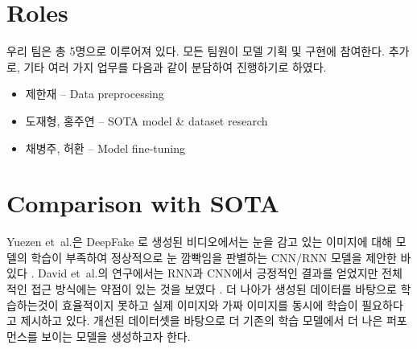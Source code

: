 \documentclass{article}
\begin{document}
\section{Roles}

우리 팀은 총 5명으로 이루어져 있다. 모든 팀원이 모델 기획 및 구현에 참여한다. 추가로, 기타 여러 가지 업무를 다음과 같이 분담하여 진행하기로 하였다.
\begin{itemize}
	\item 제한재 -- Data preprocessing
	\item 도재형, 홍주연 -- SOTA model \& dataset research
	\item 채병주, 허환 -- Model fine-tuning
\end{itemize}

\section{Comparison with SOTA}

Yuezen et~al.은 DeepFake 로 생성된 비디오에서는 눈을 감고 있는 이미지에 대해 모델의 학습이 부족하여 정상적으로 눈 깜빡임을 판별하는 CNN/RNN 모델을 제안한 바 있다 . David et~al.의 연구에서는 RNN과 CNN에서 긍정적인 결과를 얻었지만 전체적인 접근 방식에는 약점이 있는 것을 보였다 . 더 나아가 생성된 데이터를 바탕으로 학습하는것이 효율적이지 못하고 실제 이미지와 가짜 이미지를 동시에 학습이 필요하다고 제시하고 있다. 개선된 데이터셋을 바탕으로 더 기존의 학습 모델에서 더 나은 퍼포먼스를 보이는 모델을 생성하고자 한다.






\end{document}
